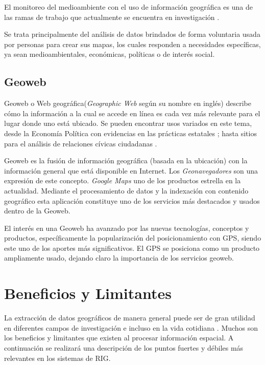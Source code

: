 \documentclass{llncs}
\begin{document}
El monitoreo del medioambiente con el uso de información geográfica es una de
las ramas de trabajo que actualmente se encuentra en investigación
\cite{connors2012}.

Se trata principalmente del análisis de datos brindados de forma voluntaria
usada por personas para crear sus mapas, los cuales responden a necesidades
específicas, ya sean medioambientales, económicas, políticas o de interés
social. \cite{harris2012}

\subsection{Geoweb}\label{sec:geoweb}

Geoweb o Web geográfica(\emph{Geographic Web} según su nombre en inglés)
describe cómo la información a la cual se accede en línea es cada vez más
relevante para el lugar donde uno está ubicado. Se pueden encontrar usos
variados en este tema, desde la Economía Política con evidencias en las
prácticas estatales \cite{leszczynski2012}; hasta sitios para el análisis
de relaciones cívicas ciudadanas \cite{johnson2015}.

Geoweb es la fusión de información geográfica (basada en la ubicación) con la
información general que está disponible en Internet. Los \emph{Geonavegadores}
son una expresión de este concepto. \emph{Google Maps} uno de los productos
estrella en la actualidad. Mediante el procesamiento de datos y la indexación
con contenido geográfico esta aplicación constituye uno de los servicios más
destacados y usados dentro de la Geoweb.

El interés en una Geoweb ha avanzado por las nuevas tecnologías, conceptos y
productos, específicamente la popularización del posicionamiento con GPS,
siendo este uno de los aportes más significativos. El GPS se posiciona como un
producto ampliamente usado, dejando claro la importancia de los servicios
geoweb.

\section{Beneficios y Limitantes}\label{sec:pros-and-cons}

La extracción de datos geográficos de manera general puede ser de gran utilidad
en diferentes campos de investigación e incluso en la vida cotidiana
\cite{artz2009}. Muchos son los beneficios y limitantes que existen al procesar
información espacial. A continuación se realizará una descripción
de los puntos fuertes y débiles más relevantes en los sistemas de RIG.
\end{document}
